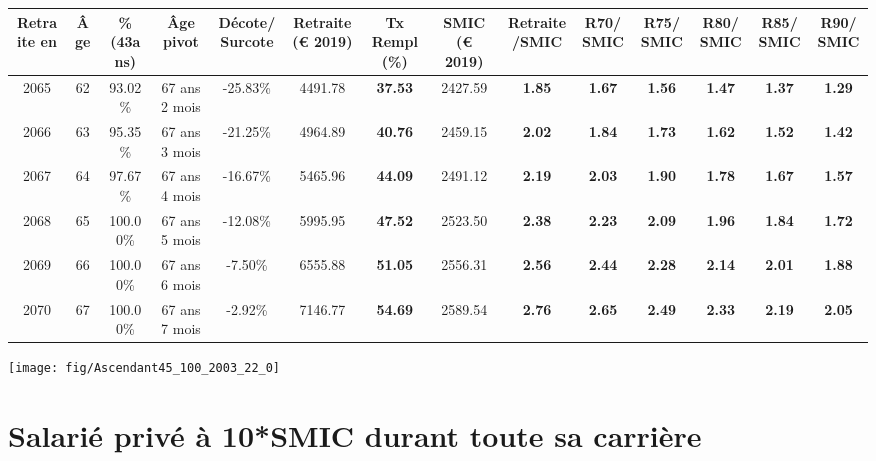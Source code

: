 \begin{adjustbox}{max width=\textwidth} 
\begin{tabular}[htb]{|c|c||c|c|c||c|c||c|c||c|c|c|c|c|} 
\hline 
 Retraite en &  Âge &  \%(43ans) &  Âge pivot &  Décote/Surcote &  Retraite (\euro{} 2019) &  Tx Rempl(\%) &  SMIC (\euro{} 2019) &  Retraite/SMIC &  R70/SMIC &  R75/SMIC &  R80/SMIC &  R85/SMIC &  R90/SMIC \\ 
\hline \hline 
 2065 &  62 &  93.02\% &  67 ans 2 mois &  -25.83\% &  4491.78 &  {\bf 37.53} &  2427.59 &  {\bf 1.85} &  {\bf 1.67} &  {\bf 1.56} &  {\bf 1.47} &  {\bf 1.37} &  {\bf 1.29} \\ 
\hline 
 2066 &  63 &  95.35\% &  67 ans 3 mois &  -21.25\% &  4964.89 &  {\bf 40.76} &  2459.15 &  {\bf 2.02} &  {\bf 1.84} &  {\bf 1.73} &  {\bf 1.62} &  {\bf 1.52} &  {\bf 1.42} \\ 
\hline 
 2067 &  64 &  97.67\% &  67 ans 4 mois &  -16.67\% &  5465.96 &  {\bf 44.09} &  2491.12 &  {\bf 2.19} &  {\bf 2.03} &  {\bf 1.90} &  {\bf 1.78} &  {\bf 1.67} &  {\bf 1.57} \\ 
\hline 
 2068 &  65 &  100.00\% &  67 ans 5 mois &  -12.08\% &  5995.95 &  {\bf 47.52} &  2523.50 &  {\bf 2.38} &  {\bf 2.23} &  {\bf 2.09} &  {\bf 1.96} &  {\bf 1.84} &  {\bf 1.72} \\ 
\hline 
 2069 &  66 &  100.00\% &  67 ans 6 mois &  -7.50\% &  6555.88 &  {\bf 51.05} &  2556.31 &  {\bf 2.56} &  {\bf 2.44} &  {\bf 2.28} &  {\bf 2.14} &  {\bf 2.01} &  {\bf 1.88} \\ 
\hline 
 2070 &  67 &  100.00\% &  67 ans 7 mois &  -2.92\% &  7146.77 &  {\bf 54.69} &  2589.54 &  {\bf 2.76} &  {\bf 2.65} &  {\bf 2.49} &  {\bf 2.33} &  {\bf 2.19} &  {\bf 2.05} \\ 
\hline 
\hline 
\end{tabular} 
\end{adjustbox} 
 
 \vspace{0.1cm} 

 {\hspace{-2.2cm}\texttt{[image: fig/Ascendant45\_100\_2003\_22\_0]}} 

\newpage 
 
\chapter{Salarié privé à 10*SMIC durant toute sa carrière} 

~\\ 
 
